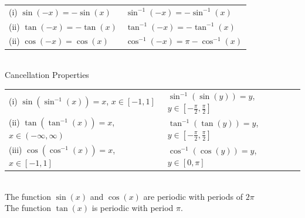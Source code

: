 \documentclass[14pt]{article}
\begin{document}
    \begin{tabular}{p{5cm}|p{5cm}}
        (i) $\sin(-x)=-\sin(x)$ & $\sin^{-1}(-x)=-\sin^{-1}(x)$\\
        (ii) $\tan(-x)=-\tan(x)$ & $\tan^{-1}(-x)=-\tan^{-1}(x)$\\
        (ii) $\cos(-x)=\cos(x)$ & $\cos^{-1}(-x)=\pi-\cos^{-1}(x)$
    \end{tabular}\\
    Cancellation Properties\\
    \begin{tabular}{p{6cm}|p{5cm}}
        (i) $\sin(\sin^{-1}(x))=x$, $x\in[-1,1]$ &
        $\sin^{-1}(\sin(y))=y$, $y\in\left[-\frac{\pi}{2},
        \frac{\pi}{2}\right]$\\
        (ii) $\tan(\tan^{-1}(x))=x$, $x\in(-\infty,\infty)$ &
        $\tan^{-1}(\tan(y))=y$, $y\in\left[-\frac{\pi}{2},
        \frac{\pi}{2}\right]$\\
        (iii) $\cos(\cos^{-1}(x))=x$, $x\in[-1,1]$ &
        $\cos^{-1}(\cos(y))=y$, $y\in\left[0, \pi\right]$\\
    \end{tabular}\\
    The function $\sin(x)$ and $\cos(x)$ are periodic with periods of
    $2\pi$\\
    The function $\tan(x)$ is periodic with period $\pi$. 
\end{document}

